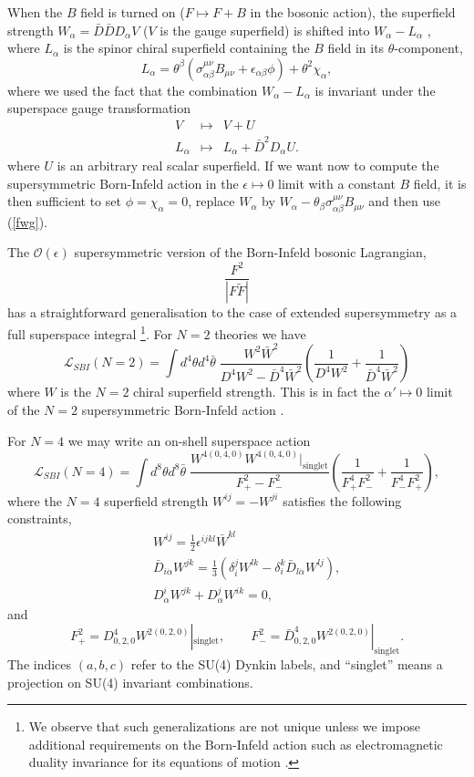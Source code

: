 \documentclass[a4paper,12pt]{article}
\begin{document}
When the $B$ field is turned on ($F\mapsto F+B$ in the bosonic action),
 the superfield strength $W_\alpha=\bar D\bar DD_\alpha V$ 
($V$ is the gauge superfield) is shifted into $W_\alpha-L_\alpha$
\cite{flz}, where $L_\alpha$ is the 
spinor chiral superfield containing the $B$ field in its
$\theta$-component,
$$
L_\alpha=\theta^\beta(\sigma^{\mu\nu}_{\alpha\beta}B_{\mu\nu}
+\epsilon_{\alpha\beta}\phi) + 
\theta^2\chi_\alpha,
$$
where we used the fact that the combination $W_\alpha-L_\alpha$ is
invariant under  the 
superspace gauge transformation 
\begin{eqnarray*}
V&\mapsto & V+U\\
L_\alpha &\mapsto &L_\alpha +{\bar D}^2D_\alpha U.
\end{eqnarray*}
where $U$ is an arbitrary real scalar superfield.
If we want now to compute  the supersymmetric Born-Infeld action in the
$\epsilon \mapsto 0$
limit with a constant $B$ field, it is then sufficient to set
$\phi=\chi_\alpha=0$, 
replace $W_\alpha$ by $W_\alpha
-\theta_\beta\sigma^{\mu\nu}_{\alpha\beta}B_{\mu\nu}$ and 
then use (\ref{fwg}).

The $\mathcal{O}(\epsilon)$ supersymmetric version of the Born-Infeld
bosonic Lagrangian,
$$
\frac{F^2}{|F\tilde F|}
$$
has a straightforward generalisation to the case of extended supersymmetry
as a full superspace 
integral \footnote{We observe that such generalizations are not unique
unless we impose additional
requirements on the Born-Infeld action such as electromagnetic
duality invariance for its equations of motion \cite{kt}.}. For $N=2$ theories we have 
$$
\mathcal{L}_{SBI}(N=2)=\int d^4\theta d^4\bar\theta\;\frac{W^2{\bar
W}^2}{D^4W^2-{\bar D}^4{\bar  W}^2}(
\frac{1}{D^4W^2}+\frac{1}{{\bar D}^4{\bar W}^2})
$$
where $W$ is the $N=2$ chiral superfield strength. This is in fact the
$\alpha'\mapsto 0$ limit of the 
$N=2$ supersymmetric Born-Infeld action \cite{k, t}.


For $N=4$ we may write an on-shell superspace action \cite{hst}
$$
\mathcal{L}_{SBI}(N=4)=\int d^8\theta d^8\bar\theta\;
\frac{W^{4(0,4,0)}W^{4(0,4,0)}|_{\mbox{singlet}}}
{F_+^2-F_-^2}(\frac{1}{F_+^4F_-^2} +\frac{1}{F_-^4F_+^2}),
$$
where the $N=4$ superfield strength $W^{ij}=-W^{ji}$ satisfies the
following constraints,
\begin{eqnarray*}
&&W^{ij}=\frac{1}{2}\epsilon^{ijkl}{\bar W}^{kl}\\
&&{\bar
D}_{i\dot\alpha}W^{jk}=\frac{1}{3}(\delta_i^jW^{lk}-\delta_i^k{\bar
D}_{l\dot\alpha}W^{lj}),\\
&&D_\alpha^iW^{jk} +D_\alpha^jW^{ik}=0,
\end{eqnarray*}
and
$$
F_+^2=D^4_{0,2,0}W^{2(0,2,0)}|_{\mbox{singlet}},\qquad F_-^2={\bar
D}^4_{0,2,0}W^{2(0,2,0)}|_{\mbox{singlet}}.
$$
The indices $(a,b,c)$ refer to the SU(4) Dynkin labels, and ``singlet''
means a projection on SU(4)
 invariant combinations. 
\end{document}
